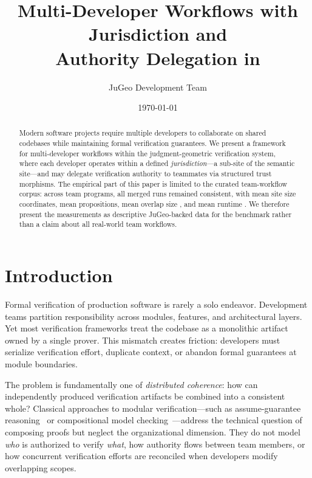 \documentclass[11pt]{article}
\title{Multi-Developer Workflows with Jurisdiction and\\Authority Delegation in \JuGeo}
\author{JuGeo Development Team}
\date{\today}
\begin{document}
\maketitle

\begin{abstract}
Modern software projects require multiple developers to collaborate on shared
codebases while maintaining formal verification guarantees. We present a
framework for multi-developer workflows within the \JuGeo{} judgment-geometric
verification system, where each developer operates within a defined
\emph{jurisdiction}---a sub-site of the semantic site---and may delegate
verification authority to teammates via structured trust morphisms. The
empirical part of this paper is limited to the curated team-workflow corpus:
across \ppLXIVteamCount{} team programs, all merged runs remained consistent,
with mean site size \ppLXIVcoordsMean{} coordinates, mean
\ppLXIVpropsMean{} propositions, mean overlap size \ppLXIVoverlapMean{}, and
mean runtime \ppLXIVtimeMean{}. We therefore present the measurements as
descriptive JuGeo-backed data for the benchmark rather than a claim about all
real-world team workflows.
\end{abstract}

\section{Introduction}\label{sec:intro}

Formal verification of production software is rarely a solo endeavor.
Development teams partition responsibility across modules, features, and
architectural layers. Yet most verification frameworks treat the codebase as a
monolithic artifact owned by a single prover. This mismatch creates friction:
developers must serialize verification effort, duplicate context, or abandon
formal guarantees at module boundaries.

The problem is fundamentally one of \emph{distributed coherence}: how can
independently produced verification artifacts be combined into a consistent
whole? Classical approaches to modular verification---such as assume-guarantee
reasoning~\cite{henzinger1998you} or compositional model
checking~\cite{clarke2000counterexample}---address the technical question of
composing proofs but neglect the organizational dimension. They do not model
\emph{who} is authorized to verify \emph{what}, how authority flows between
team members, or how concurrent verification efforts are reconciled when
developers modify overlapping scopes.
\end{document}
